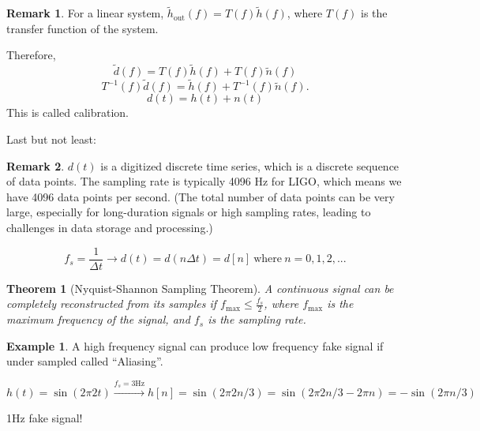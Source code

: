 \documentclass[12pt, a4paper]{article}
\newcounter{lecture}              %
\theoremstyle{plain} %
\newtheorem{theorem}{Theorem}[lecture]      %
\theoremstyle{definition} %
\newtheorem{example}{Example}[lecture]
\newtheorem{remark}{Remark}[lecture]
\begin{document}
\begin{remark}
    For a linear system, $\tilde h_\mathrm{out}(f) = T(f) \tilde h(f)$, where $T(f)$ is the transfer function of the system. 

    Therefore,
    \begin{equation}
        \tilde d(f) = T(f) \tilde h(f) + T(f) \tilde n(f)
    \end{equation}
    \begin{equation}
        T^{-1}(f) \tilde d(f) = \tilde h(f) + T^{-1}(f) \tilde n(f).
    \end{equation}
    \begin{equation}
        d(t) = h(t) + n(t)
    \end{equation}
This is called calibration.
\end{remark}

Last but not least:
\begin{remark}
    $d(t)$ is a digitized discrete time series, which is a discrete sequence of data points. The sampling rate is typically 4096 Hz for LIGO, which means we have 4096 data points per second. (The total number of data points can be very large, especially for long-duration signals or high sampling rates, leading to challenges in data storage and processing.) 
\end{remark}

\begin{equation}
    f_s = \frac{1}{\Delta t} \rightarrow d(t) = d(n \Delta t) = d[n] ~\mathrm{where}~n =0,1,2,...
\end{equation}

\begin{theorem}[Nyquist-Shannon Sampling Theorem]
    A continuous signal can be completely reconstructed from its samples if $f_\mathrm{max} \leq \frac{f_s}{2}$, where $f_\mathrm{max}$ is the maximum frequency of the signal, and $f_s$ is the sampling rate.
\end{theorem}

\begin{example}
    A high frequency signal can produce low frequency fake signal if under sampled called ``Aliasing''.

    \begin{equation}
        h(t) = \sin(2\pi 2t) \xrightarrow{f_s=3\mathrm{Hz}} h[n] = \sin(2\pi 2n/3) = \sin(2\pi 2n/3 - 2\pi n) = -\sin(2\pi n/3)
    \end{equation}

    1Hz fake signal!
\end{example}
\end{document}
